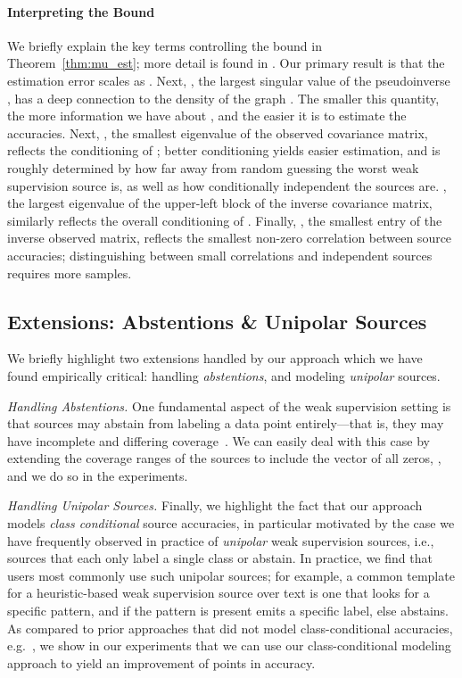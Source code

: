 \documentclass[letterpaper]{article}
\begin{document}
\paragraph{Interpreting the Bound} 
We briefly explain the key terms controlling the bound in Theorem~\ref{thm:mu_est}; more detail is found in .
Our primary result is that the estimation error scales as .
Next, , the largest singular value of the pseudoinverse , has a deep connection to the density of the graph .
The smaller this quantity, the more information we have about , and the easier it is to estimate the accuracies. 
Next, , the smallest eigenvalue of the observed covariance matrix, reflects the conditioning of ; better conditioning yields easier estimation, and is roughly determined by how far away from random guessing the worst weak supervision source is, as well as how conditionally independent the sources are.
, the largest eigenvalue of the upper-left block of the inverse covariance matrix, similarly reflects the overall conditioning of .
Finally, , the smallest entry of the inverse observed matrix, reflects the smallest non-zero correlation between source accuracies; distinguishing between small correlations and independent sources requires more samples.

\subsection{Extensions: Abstentions \& Unipolar Sources}
\label{sec:extensions}
We briefly highlight two extensions handled by our approach which we have found empirically critical: handling \textit{abstentions}, and modeling \textit{unipolar} sources.

\textit{Handling Abstentions. }
One fundamental aspect of the weak supervision setting is that sources may abstain from labeling a data point entirely---that is, they may have incomplete and differing coverage~\cite{ratner2018snorkel,Dalvi:2013:ACB:2488388.2488414}.
We can easily deal with this case by extending the coverage ranges  of the sources to include the vector of all zeros, , and we do so in the experiments.

\textit{Handling Unipolar Sources. }
Finally, we highlight the fact that our approach models \textit{class conditional} source accuracies, in particular motivated by the case we have frequently observed in practice of \textit{unipolar} weak supervision sources, i.e., sources that each only label a single class or abstain.
In practice, we find that users most commonly use such unipolar sources; for example, a common template for a heuristic-based weak supervision source over text is one that looks for a specific pattern, and if the pattern is present emits a specific label, else abstains. 
As compared to prior approaches that did not model class-conditional accuracies, e.g.~\cite{ratner2016data}, we show in our experiments that we can use our class-conditional modeling approach to yield an improvement of  points in accuracy.
 
\end{document}
